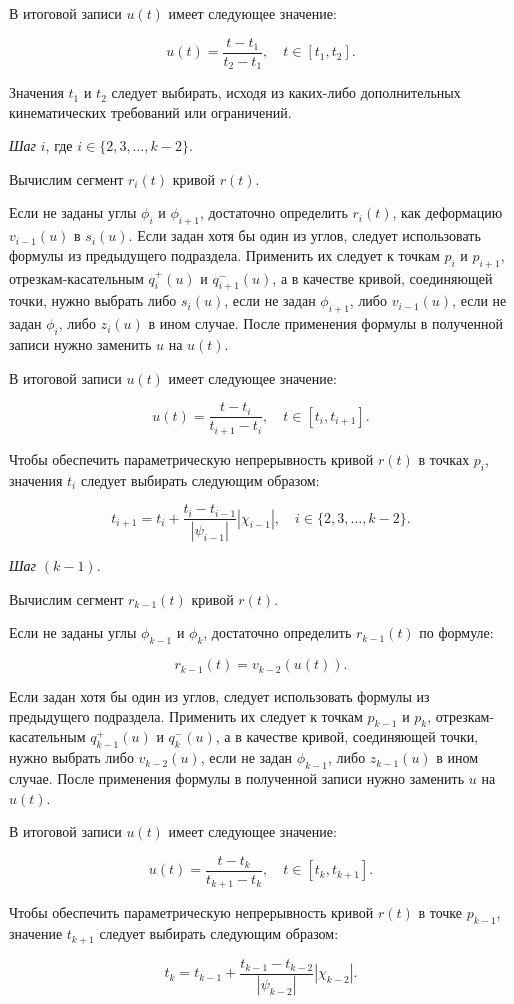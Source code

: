 В итоговой записи $u(t)$ имеет следующее значение:

$$
u(t)=\frac{t-t_1}{t_2-t_1}, \quad t \in [t_1,t_2].
$$

Значения $t_1$ и $t_2$ следует выбирать, исходя из каких-либо дополнительных кинематических требований или ограничений.

\bigskip
\textit{Шаг} $i$, где $i \in \{2,3,\dots,k-2\}$.

Вычислим сегмент $r_i(t)$ кривой $r(t)$.

Если не заданы углы $\phi_i$ и $\phi_{i+1}$, достаточно определить $r_i(t)$, как деформацию $v_{i-1}(u)$ в $s_i(u)$.
Если задан хотя бы один из углов, следует использовать формулы из предыдущего подраздела. Применить их следует к
точкам $p_i$ и $p_{i+1}$, отрезкам-касательным $q_i^+(u)$ и $q_{i+1}^-(u)$, а в качестве кривой, соединяющей точки,
нужно выбрать либо $s_i(u)$, если не задан $\phi_{i+1}$, либо $v_{i-1}(u)$, если не задан $\phi_i$, либо $z_i(u)$
в ином случае. После применения формулы в полученной записи нужно заменить $u$ на $u(t)$.

В итоговой записи $u(t)$ имеет следующее значение:

$$
u(t)=\frac{t-t_i}{t_{i+1}-t_i}, \quad t \in [t_i,t_{i+1}].
$$

Чтобы обеспечить параметрическую непрерывность кривой $r(t)$ в точках $p_i$, значения $t_i$ следует выбирать
следующим образом:

$$
t_{i+1}=t_i+\frac{t_i-t_{i-1}}{|\psi_{i-1}|}|\chi_{i-1}|, \quad i \in \{2,3,\dots,k-2\}.
$$

\bigskip
\textit{Шаг} $(k-1)$.

Вычислим сегмент $r_{k-1}(t)$ кривой $r(t)$.

Если не заданы углы $\phi_{k-1}$ и $\phi_k$, достаточно определить $r_{k-1}(t)$ по формуле:

$$
r_{k-1}(t)=v_{k-2}(u(t)).
$$

Если задан хотя бы один из углов, следует использовать формулы из предыдущего подраздела. Применить их следует к
точкам $p_{k-1}$ и $p_k$, отрезкам-касательным $q_{k-1}^+(u)$ и $q_k^-(u)$, а в качестве кривой, соединяющей точки,
нужно выбрать либо $v_{k-2}(u)$, если не задан $\phi_{k-1}$, либо $z_{k-1}(u)$ в ином случае. После применения формулы
в полученной записи нужно заменить $u$ на $u(t)$.

В итоговой записи $u(t)$ имеет следующее значение:

$$
u(t)=\frac{t-t_k}{t_{k+1}-t_k}, \quad t \in [t_k,t_{k+1}].
$$

Чтобы обеспечить параметрическую непрерывность кривой $r(t)$ в точке $p_{k-1}$, значение $t_{k+1}$ следует выбирать
следующим образом:

$$
t_k=t_{k-1}+\frac{t_{k-1}-t_{k-2}}{|\psi_{k-2}|}|\chi_{k-2}|.
$$
